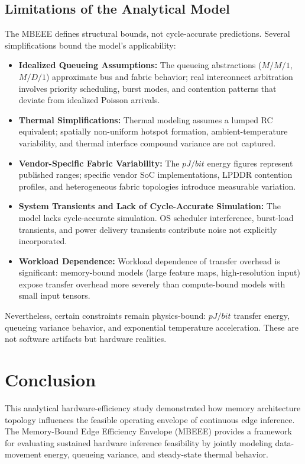\documentclass[conference]{IEEEtran}
\begin{document}
\subsection{Limitations of the Analytical Model}
The MBEEE defines structural bounds, not cycle-accurate predictions. Several simplifications bound the model's applicability:

\begin{itemize}
    \item \textbf{Idealized Queueing Assumptions:} The queueing abstractions ($M/M/1$, $M/D/1$) approximate bus and fabric behavior; real interconnect arbitration involves priority scheduling, burst modes, and contention patterns that deviate from idealized Poisson arrivals.
    \item \textbf{Thermal Simplifications:} Thermal modeling assumes a lumped RC equivalent; spatially non-uniform hotspot formation, ambient-temperature variability, and thermal interface compound variance are not captured.
    \item \textbf{Vendor-Specific Fabric Variability:} The $pJ/bit$ energy figures represent published ranges; specific vendor SoC implementations, LPDDR contention profiles, and heterogeneous fabric topologies introduce measurable variation.
    \item \textbf{System Transients and Lack of Cycle-Accurate Simulation:} The model lacks cycle-accurate simulation. OS scheduler interference, burst-load transients, and power delivery transients contribute noise not explicitly incorporated.
    \item \textbf{Workload Dependence:} Workload dependence of transfer overhead is significant: memory-bound models (large feature maps, high-resolution input) expose transfer overhead more severely than compute-bound models with small input tensors.
\end{itemize}

Nevertheless, certain constraints remain physics-bound: $pJ/bit$ transfer energy, queueing variance behavior, and exponential temperature acceleration. These are not software artifacts but hardware realities.

\section{Conclusion}
This analytical hardware-efficiency study demonstrated how memory architecture topology influences the feasible operating envelope of continuous edge inference. The Memory-Bound Edge Efficiency Envelope (MBEEE) provides a framework for evaluating sustained hardware inference feasibility by jointly modeling data-movement energy, queueing variance, and steady-state thermal behavior.
\end{document}
